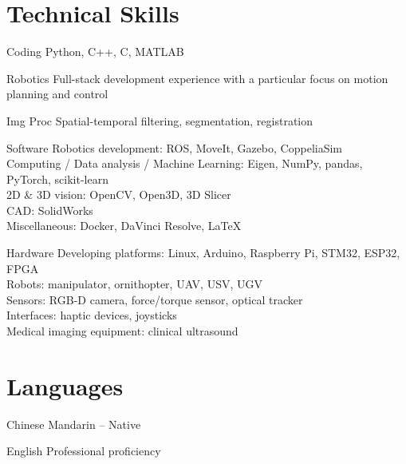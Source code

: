 \documentclass[11pt,letterpaper]{report}
\begin{document}
\section*{Technical Skills}
\begin{tablist}
	\item[Coding] \tab Python, C++, C, MATLAB
	\item[Robotics] \tab Full-stack development experience with a particular focus on motion planning and control
	\item [Img Proc] \tab Spatial-temporal filtering, segmentation, registration
	\item[Software] \tab Robotics development: ROS, MoveIt, Gazebo, CoppeliaSim\\
	Computing / Data analysis / Machine Learning: Eigen, NumPy, pandas, PyTorch, scikit-learn\\
	2D \& 3D vision: OpenCV, Open3D, 3D Slicer\\
	CAD: SolidWorks\\
	Miscellaneous: Docker, DaVinci Resolve, \LaTeX
	\item[Hardware] \tab Developing platforms: Linux, Arduino, Raspberry Pi, STM32, ESP32, FPGA\\
	Robots: manipulator, ornithopter, UAV, USV, UGV\\ 
	Sensors: RGB-D camera, force/torque sensor, optical tracker\\
	Interfaces: haptic devices, joysticks\\
	Medical imaging equipment: clinical ultrasound
\end{tablist}


\section*{Languages}
\begin{tablist}
	\item[Chinese] \tab Mandarin -- Native
	\item[English] \tab Professional proficiency
\end{tablist}
\newpage
\end{document}
